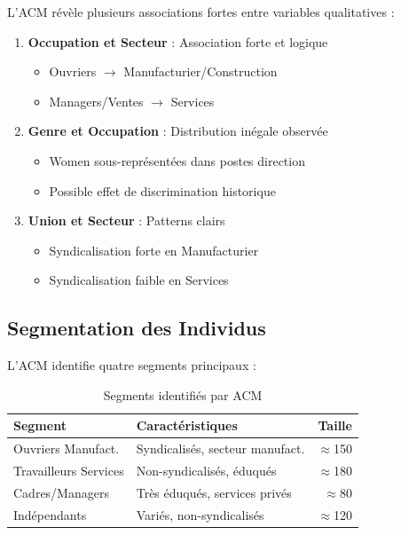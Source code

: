 \documentclass[12pt,a4paper]{report}
\begin{document}
L'ACM révèle plusieurs associations fortes entre variables qualitatives :

\begin{enumerate}
    \item \textbf{Occupation et Secteur} : Association forte et logique
    \begin{itemize}
        \item Ouvriers $\rightarrow$ Manufacturier/Construction
        \item Managers/Ventes $\rightarrow$ Services
    \end{itemize}
    
    \item \textbf{Genre et Occupation} : Distribution inégale observée
    \begin{itemize}
        \item Women sous-représentées dans postes direction
        \item Possible effet de discrimination historique
    \end{itemize}
    
    \item \textbf{Union et Secteur} : Patterns clairs
    \begin{itemize}
        \item Syndicalisation forte en Manufacturier
        \item Syndicalisation faible en Services
    \end{itemize}
\end{enumerate}

\subsection{Segmentation des Individus}

L'ACM identifie quatre segments principaux :

\begin{table}[H]
\centering
\caption{Segments identifiés par ACM}
\begin{tabular}{|l|p{4cm}|r|}
\hline
\textbf{Segment} & \textbf{Caractéristiques} & \textbf{Taille} \\
\hline
Ouvriers Manufact. & Syndicalisés, secteur manufact. & $\approx$150 \\
\hline
Travailleurs Services & Non-syndicalisés, éduqués & $\approx$180 \\
\hline
Cadres/Managers & Très éduqués, services privés & $\approx$80 \\
\hline
Indépendants & Variés, non-syndicalisés & $\approx$120 \\
\hline
\end{tabular}
\end{table}
\end{document}
